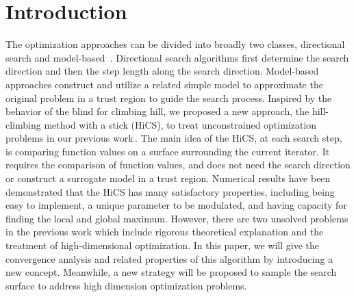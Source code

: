 \section{Introduction}
\label{sec:intro}

The optimization approaches can be divided into broadly two
classes, directional search and
model-based\,\cite{sun2006optimization} \cite{nocedal2006numerical}
\cite{conn2009introduction}.
Directional search algorithms first determine the search
direction and then the step length along the search
direction. Model-based approaches construct and utilize a related simple
model to approximate the original problem in a trust region to
guide the search process. 
Inspired by the behavior of the blind for climbing hill, we
proposed a new approach, the hill-climbing method with a stick
(HiCS), to treat unconstrained optimization problems in
our previous work\,\cite{huang2017hill}.
The main idea of the HiCS, at each search step, is comparing
function values on a surface surrounding the current iterator.
It requires the comparison of function values, and
does not need the search direction or construct a surrogate
model in a trust region.
Numerical results have been demonstrated that the HiCS has many 
satisfactory properties, including being easy to implement,
a unique parameter to be modulated, and having capacity
for finding the local and global maximum. 
However, there are two unsolved problems in the
previous work which include rigorous theoretical explanation and
the treatment of high-dimensional optimization.
In this paper, we will give the convergence analysis and related
properties of this algorithm by introducing a new concept. 
Meanwhile, a new strategy will be proposed to sample the search
surface to address high dimension optimization problems.

